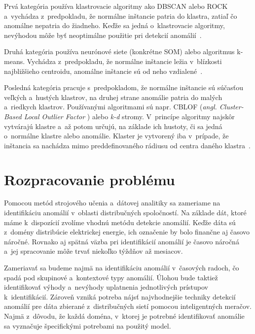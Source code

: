 \documentclass[a4paper,twoside,slovak,12pt]{article}
\begin{document}
Prvá kategória používa klastrovacie algoritmy ako DBSCAN alebo ROCK
a~vychádza z~predpokladu, že normálne inštancie patria do klastra, zatiaľ čo
anomálne nepatria do žiadneho. Keďže sa jedná o~klastrovacie algoritmy, nevýhodou
môže byť neoptimálne použitie pri detekcií anomálií~\cite{Chandola2009}.

Druhá kategória používa neurónové siete (konkrétne SOM) alebo algoritmus k-means.
Vychádza z~predpokladu, že normálne inštancie ležia v~blízkosti najbližšieho
centroidu, anomálne inštancie sú od neho vzdialené~\cite{Chandola2009}.

Posledná kategória pracuje s~predpokladom, že normálne inštancie sú súčasťou
veľkých a~hustých klastrov, na druhej strane anomálie patria do malých a~riedkych
klastrov. Používanými algoritmami sú napr. CBLOF (\textit{angl. Cluster-Based Local Outlier Factor}
) alebo \textit{k-d} stromy. V~princípe algoritmy najskôr vytvárajú klastre
a~až potom určujú, na základe ich hustoty, či sa jedná o~normálne klastre alebo
anomálie. Klaster je vytvorený iba v~prípade, že inštancia sa nachádza mimo
preddefinovaného rádiusu od centra daného klastra~\cite{Salvador2005}.


\newpage
\section{Rozpracovanie problému}
Pomocou metód strojového učenia a~dátovej analitiky sa zameriame na identifikáciu
anomálií v~oblasti distribučných spoločností. Na základe dát, ktoré máme
k~dispozícií zvolíme vhodnú metódu detekcie anomálií. Keďže dáta sú z~domény
distribúcie elektrickej energie, ich označenie by bolo finančne aj časovo
náročné. Rovnako aj spätná väzba pri identifikácií anomálií je časovo náročná
a~jej spracovanie môže trvať niekoľko týždňov až mesiacov.

Zameriavať sa budeme najmä na identifikáciu anomálií v~časových radoch, čo spadá
pod skupinové a~kontextové typy anomálií. Úlohou bude taktiež identifikovať
výhody a~nevýhody uplatnenia jednotlivých prístupov k~identifikácií. Zároveň
vzniká potreba nájsť najvhodnejšie techniky detekcií anomálií pre dáta zbierané
z~distribučných sietí pomocou inteligentných meračov. Najmä z~dôvodu, že každá
doména, v~ktorej je potrebné identifikovať anomálie sa vyznačuje špecifickými
potrebami na použitý model.



\newpage


\end{document}
